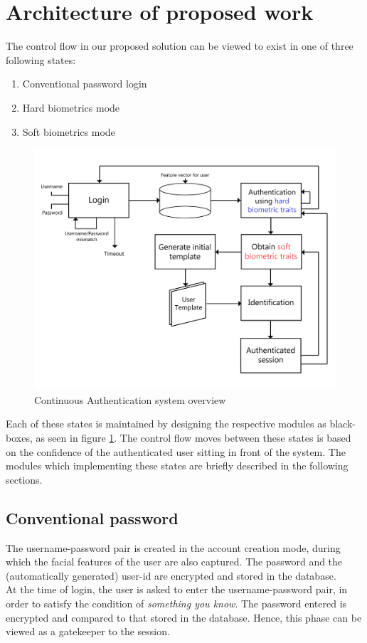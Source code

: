 \documentclass[%
        final,
        notitlepage,
        narroweqnarray,
        inline,
        ]{ieee}
\begin{document}
\section{Architecture of proposed work} \label{sec:arch}
The control flow in our proposed solution can be viewed to exist in one of three following states:
\begin{enumerate}
	\item Conventional password login
	\item Hard biometrics mode
	\item Soft biometrics mode
\end{enumerate}
\begin{figure}[h!]
	\centering
	\includegraphics[scale=0.5]{img/overall_f.png}
	\caption{Continuous Authentication system overview}
	\label{fig:ca_overview}
\end{figure}
Each of these states is maintained by designing the respective modules as black-boxes, as seen in figure \ref{fig:ca_overview}.
The control flow moves between these states is based on the confidence of the authenticated user sitting in front of the system.
The modules which implementing these states are briefly described in the following sections.

\subsection{Conventional password}
The username-password pair is created in the account creation mode, during which the facial features of the user are also captured.
The password and the (automatically generated) user-id are encrypted and stored in the database.\\
At the time of login, the user is asked to enter the username-password pair, in order to satisfy the condition of \emph{something you know}.
The password entered is encrypted and compared to that stored in the database.
Hence, this phase can be viewed as a gatekeeper to the session. 
\end{document}
